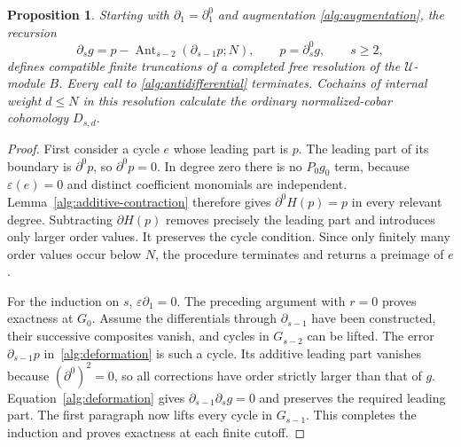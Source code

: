 \documentclass[11pt]{article}
\newtheorem{proposition}[theorem]{Proposition}
\theoremstyle{definition}
\theoremstyle{remark}
\numberwithin{equation}{section}
\begin{document}
\begin{proposition}\label{alg:resolution-correct}
Starting with $\partial_1=\partial^0_1$ and augmentation
\eqref{alg:augmentation}, the recursion
\begin{equation}\label{alg:deformation}
 \partial_sg=p-
   \operatorname{Ant}_{s-2}(\partial_{s-1}p;N),
 \qquad p=\partial^0_sg,\qquad s\geq2,
\end{equation}
defines compatible finite truncations of a completed free resolution
of the $\mathcal U$-module $B$.  Every call to
\eqref{alg:antidifferential} terminates.  Cochains of internal weight
$d\leq N$ in this resolution calculate the ordinary normalized-cobar
cohomology $D_{s,d}$.
\end{proposition}

\begin{proof}
First consider a cycle $e$ whose leading part is $p$.  The leading part
of its boundary is $\partial^0p$, so $\partial^0p=0$.  In degree zero
there is no $P_0g_0$ term, because $\varepsilon(e)=0$ and distinct
coefficient monomials are independent.  Lemma~\ref{alg:additive-contraction}
therefore gives $\partial^0H(p)=p$ in every relevant degree.  Subtracting
$\partial H(p)$ removes precisely the leading part and introduces only
larger order values.  It preserves the cycle condition.  Since only
finitely many order values occur below $N$, the procedure terminates
and returns a preimage of $e$.

For the induction on $s$, $\varepsilon\partial_1=0$.  The preceding
argument with $r=0$ proves exactness at $G_0$.  Assume the differentials
through $\partial_{s-1}$ have been constructed, their successive
composites vanish, and cycles in $G_{s-2}$ can be lifted.  The error
$\partial_{s-1}p$ in~\eqref{alg:deformation} is such a cycle.  Its
additive leading part vanishes because $(\partial^0)^2=0$, so all
corrections have order strictly larger than that of $g$.
Equation~\eqref{alg:deformation} gives
$\partial_{s-1}\partial_sg=0$ and preserves the required leading part.
The first paragraph now lifts every cycle in $G_{s-1}$.  This completes
the induction and proves exactness at each finite cutoff.


\end{proof}
\end{document}
